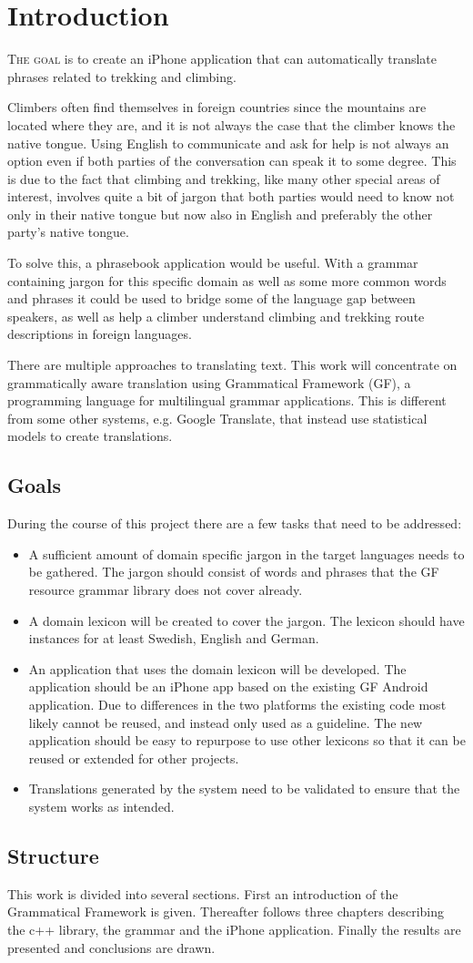 \chapter{Introduction}
\lettrine[lines=4, loversize=-0.1, lraise=0.1]{T}{he goal} is to create an iPhone application that can automatically translate phrases related to trekking and climbing.

Climbers often find themselves in foreign countries since the mountains are located where they are, and it is not always the case that the climber knows the native tongue. Using English to communicate and ask for help is not always an option even if both parties of the conversation can speak it to some degree. This is due to the fact that climbing and trekking, like many other special areas of interest, involves quite a bit of jargon that both parties would need to know not only in their native tongue but now also in English and preferably the other party's native tongue.

To solve this, a phrasebook application would be useful. With a grammar containing jargon for this specific domain as well as some more common words and phrases it could be used to bridge some of the language gap between speakers, as well as help a climber understand climbing and trekking route descriptions in foreign languages.

There are multiple approaches to translating text. This work will concentrate on grammatically aware translation using Grammatical Framework (GF), a programming language for multilingual grammar applications. This is different from some other systems, e.g. Google Translate, that instead use statistical models to create translations.

\section{Goals}
During the course of this project there are a few tasks that need to be addressed:
\begin{itemize}
\item A sufficient amount of domain specific jargon in the target languages needs to be gathered. The jargon should consist of words and phrases that the GF resource grammar library does not cover already.
\item A domain lexicon will be created to cover the jargon. The lexicon should have instances for at least Swedish, English and German.
\item An application that uses the domain lexicon will be developed. The application should be an iPhone app based on the existing GF Android application. Due to differences in the two platforms the existing code most likely cannot be reused, and instead only used as a guideline. The new application should be easy to repurpose to use other lexicons so that it can be reused or extended for other projects.
\item Translations generated by the system need to be validated to ensure that the system works as intended.
\end{itemize}

\section{Structure}
This work is divided into several sections. First an introduction of the Grammatical Framework is given. Thereafter follows three chapters describing the c++ library, the grammar and the iPhone application. Finally the results are presented and conclusions are drawn.

